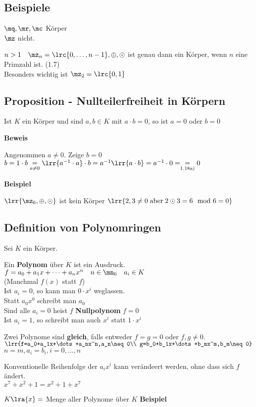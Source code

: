 \subsection{Beispiele}
		\item $\mq,\mr,\mc$ Körper\\
			$\mz$ nicht.
		\item $n>1\quad\mz_n=\lrc{0,\dots,n-1},\oplus,\odot$ ist genau dann ein Körper, wenn $n$ eine Primzahl ist. (1.7)\\
			Besonders wichtig ist $\mz_2=\lrc{0,1}$
	\subExEnd
\subsection{Proposition - Nullteilerfreiheit in Körpern}
	Ist $K$ ein Körper und sind $a,b\in K$ mit $a\cdot b=0$, so ist $a=0$ oder $b=0$
	
	\textbf{Beweis}
	
	Angenommen $a\neq 0$. Zeige $b=0$\\
	$b=1\cdot b \underset{a\neq 0}{=} \lrr{a^{-1}\cdot a}\cdot b=a^{-1}\lrr{a\cdot b}=a^{-1}\cdot 0=\underset{\mbox{\scriptsize 1.18a)}}{=}0$
	
	\textbf{Beispiel}
	
	$\lrr{\mz_6,\oplus,\odot}$ ist kein Körper $\lrr{2,3\neq 0 \;\mbox{aber}\; 2\odot 3=6\mod 6 =0}$
\subsection{Definition von Polynomringen}
	Sei $K$ ein Körper.
		\item Ein \textbf{Polynom} über $K$ ist ein Ausdruck.\\
			$f=a_0+a_1x+\dots+a_nx^n\quad n\in\mn_0\quad a_i\in K$\\
			(Manchmal $f(x)$ statt $f$)\\
			Ist $a_i=0$, so kann man $0\cdot x^i$ weglassen.\\
			Statt $a_0x^0$ schreibt man $a_0$\\
			Sind alle $a_i=0$ heist $f$ \textbf{Nullpolynom} $f=0$\\
			Ist $a_i = 1$, so schreibt man auch $x^i$ statt $1\cdot x^i$
		\item Zwei Polynome sind \textbf{gleich}, falls entweder $f=g=0$ oder $f,g\neq 0$.\\
			$\lrr{f=a_0+a_1x+\dots+a_nx^n,a_n\neq 0\\
			g=b_0+b_1x+\dots+b_mx^m,b_m\neq 0}$\\
			$n=m, a_i=b_i, i=0,\dots,n$
		\item Konventionelle Reihenfolge der $a_ix^i$ kann verändeert werden, ohne dass sich $f$ ändert.\\
			$x^7+x^2+1=x^2+1+x^7$
		\item $K\lra{x}=$ Menge aller Polynome über $K$
	\subExEnd
	\textbf{Beispiel}
	

